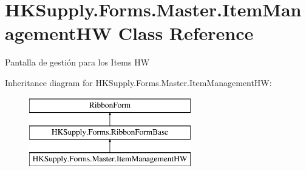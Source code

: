 \hypertarget{class_h_k_supply_1_1_forms_1_1_master_1_1_item_management_h_w}{}\section{H\+K\+Supply.\+Forms.\+Master.\+Item\+Management\+HW Class Reference}
\label{class_h_k_supply_1_1_forms_1_1_master_1_1_item_management_h_w}


Pantalla de gestión para los Items HW  


Inheritance diagram for H\+K\+Supply.\+Forms.\+Master.\+Item\+Management\+HW\+:\begin{figure}[H]
\begin{center}
\leavevmode
\includegraphics[height=3.000000cm]{class_h_k_supply_1_1_forms_1_1_master_1_1_item_management_h_w}
\end{center}
\end{figure}
